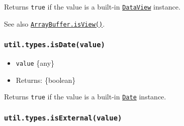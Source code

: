 Returns \texttt{true} if the value is a built-in
\href{https://developer.mozilla.org/en-US/docs/Web/JavaScript/Reference/Global_Objects/DataView}{\texttt{DataView}}
instance.

\begin{Shaded}
\begin{Highlighting}[]
\OperatorTok{=}  \NormalTok{(}\NormalTok{)}\OperatorTok{;}
\NormalTok{(} \OperatorTok{;}  
\NormalTok{(} \NormalTok{())}\OperatorTok{;}  
\end{Highlighting}
\end{Shaded}

See also
\href{https://developer.mozilla.org/en-US/docs/Web/JavaScript/Reference/Global_Objects/ArrayBuffer/isView}{\texttt{ArrayBuffer.isView()}}.

\subsubsection{\texorpdfstring{\texttt{util.types.isDate(value)}}{util.types.isDate(value)}}\label{util.types.isdatevalue}

\begin{itemize}
\tightlist
\item
  \texttt{value} \{any\}
\item
  Returns: \{boolean\}
\end{itemize}

Returns \texttt{true} if the value is a built-in
\href{https://developer.mozilla.org/en-US/docs/Web/JavaScript/Reference/Global_Objects/Date}{\texttt{Date}}
instance.

\begin{Shaded}
\begin{Highlighting}[]
\NormalTok{(} \NormalTok{())}\OperatorTok{;}  
\end{Highlighting}
\end{Shaded}

\subsubsection{\texorpdfstring{\texttt{util.types.isExternal(value)}}{util.types.isExternal(value)}}\label{util.types.isexternalvalue}

